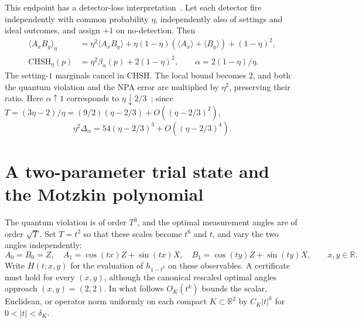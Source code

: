 \documentclass[11pt]{article}
\theoremstyle{remark}\newtheorem{remark}[theorem]{Remark}
\newcommand{\R}{\mathbb R}\newcommand{\C}{\mathbb C}
\begin{document}
This endpoint has a detector-loss interpretation~\cite{MiklinEtAl2022,GigenaEtAl2025}.
Let each detector fire independently with common probability $\eta$,
independently also of settings and ideal outcomes, and assign $+1$ on
no-detection. Then
\begin{align*}
\langle A_xB_y\rangle_\eta
&=\eta^2\langle A_xB_y\rangle+
\eta(1-\eta)(\langle A_x\rangle+\langle B_y\rangle)+(1-\eta)^2,\\
\mathrm{CHSH}_\eta(p)&=\eta^2\beta_\alpha(p)+2(1-\eta)^2,
\qquad \alpha=2(1-\eta)/\eta.
\end{align*}
The setting-$1$ marginals cancel in CHSH. The local bound becomes $2$,
and both the quantum violation and the NPA error are multiplied by
$\eta^2$, preserving their ratio. Here $\alpha\uparrow1$ corresponds
to $\eta\downarrow2/3$~\cite{Eberhard1993}; since
$T=(3\eta-2)/\eta=(9/2)(\eta-2/3)+O((\eta-2/3)^2)$,
\begin{equation}
\eta^2\Delta_\alpha=54(\eta-2/3)^3+O((\eta-2/3)^4).
\label{supp:eq:loss-cubic}
\end{equation}

\section{A two-parameter trial state and the Motzkin polynomial}
\label{supp:sec:motzkin}\label{supp:sec:not-sos}
The quantum violation is of order $T^3$, and the optimal measurement angles
are of order $\sqrt T$. Set $T=t^2$ so that these scales become $t^6$
and $t$, and vary the two angles independently:
\begin{equation}
A_0=B_0=Z,\quad A_1=\cos(tx)Z+\sin(tx)X,\quad
B_1=\cos(ty)Z+\sin(ty)X,\qquad x,y\in\R.
\label{supp:eq:two-parameter-observables}
\end{equation}
Write $H(t;x,y)$ for the evaluation of $h_{1-t^2}$ on these observables.
A certificate must hold for every $(x,y)$, although the canonical rescaled
optimal angles approach $(x,y)=(2,2)$. In what follows
$O_K(t^k)$ bounds the scalar, Euclidean, or operator norm uniformly on each
compact $K\subset\R^2$ by $C_K|t|^k$ for $0<|t|<\delta_K$.
\end{document}
